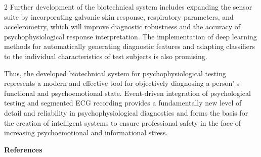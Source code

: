 \begin{multicols}{2}
Further development of the biotechnical system includes expanding the
sensor suite by incorporating galvanic skin response, respiratory
parameters, and accelerometry, which will improve diagnostic robustness
and the accuracy of psychophysiological response interpretation. The
implementation of deep learning methods for automatically generating
diagnostic features and adapting classifiers to the individual
characteristics of test subjects is also promising.

Thus, the developed biotechnical system for psychophysiological testing
represents a modern and effective tool for objectively diagnosing a
person' s functional and psychoemotional state.
Event-driven integration of psychological testing and segmented ECG
recording provides a fundamentally new level of detail and reliability
in psychophysiological diagnostics and forms the basis for the creation
of intelligent systems to ensure professional safety in the face of
increasing psychoemotional and informational stress.
\end{multicols}

\begin{center}
{\bfseries References}
\end{center}

